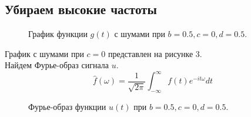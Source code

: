 \documentclass[a5paper, 10pt]{article}
\theoremstyle{definition}
\theoremstyle{plain}
\theoremstyle{remark}
\begin{document}
\subsection{Убираем высокие частоты}

\begin{figure}[h!]
\caption{График функции $g(t)$ с шумами при $b = 0.5, c = 0, d = 0.5$.}
\end{figure}

График с шумами при $c= 0$ представлен на рисунке 3. \\
Найдем Фурье-образ сигнала $u$.
\begin{equation}
\hat{f}(\omega) = \frac{1}{\sqrt{2 \pi}} \int_{-\infty}^{\infty} f(t) e^{-i t \omega} dt
\end{equation}

\begin{figure}[h!]
\caption{Фурье-образ функции $u(t)$ при $b = 0.5, c = 0, d = 0.5$.}
\end{figure}
\end{document}
